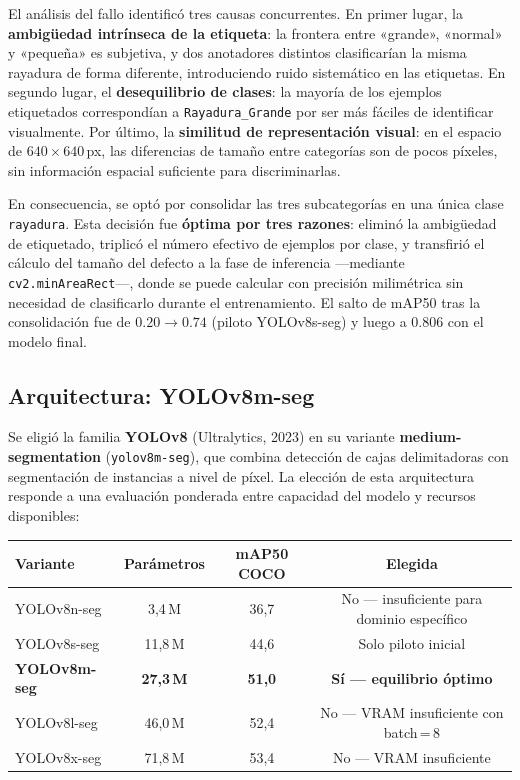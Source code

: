 \documentclass[12pt,a4paper]{article}
\begin{document}
El análisis del fallo identificó tres causas concurrentes. En primer lugar, la
\textbf{ambigüedad intrínseca de la etiqueta}: la frontera entre «grande», «normal»
y «pequeña» es subjetiva, y dos anotadores distintos clasificarían la misma rayadura de
forma diferente, introduciendo ruido sistemático en las etiquetas. En segundo lugar, el
\textbf{desequilibrio de clases}: la mayoría de los ejemplos etiquetados correspondían
a \texttt{Rayadura\_Grande} por ser más fáciles de identificar visualmente. Por último,
la \textbf{similitud de representación visual}: en el espacio de $640\times 640\,$px,
las diferencias de tamaño entre categorías son de pocos píxeles, sin información
espacial suficiente para discriminarlas.

En consecuencia, se optó por consolidar las tres subcategorías en una única clase
\texttt{rayadura}. Esta decisión fue \textbf{óptima por tres razones}: eliminó la
ambigüedad de etiquetado, triplicó el número efectivo de ejemplos por clase, y transfirió
el cálculo del tamaño del defecto a la fase de inferencia —mediante \texttt{cv2.minAreaRect}—,
donde se puede calcular con precisión milimétrica sin necesidad de clasificarlo
durante el entrenamiento. El salto de mAP50 tras la consolidación fue de
$0.20 \to 0.74$ (piloto YOLOv8s-seg) y luego a $\mathbf{0.806}$ con el modelo final.

\subsection{Arquitectura: YOLOv8m-seg}

Se eligió la familia \textbf{YOLOv8} (Ultralytics, 2023) en su variante
\textbf{medium-segmentation} (\texttt{yolov8m-seg}), que combina detección de cajas
delimitadoras con segmentación de instancias a nivel de píxel. La elección de esta
arquitectura responde a una evaluación ponderada entre capacidad del modelo y
recursos disponibles:

\begin{center}
\begin{tabular}{lccc}
  \toprule
  \textbf{Variante} & \textbf{Parámetros} & \textbf{mAP50 COCO} & \textbf{Elegida} \\
  \midrule
  YOLOv8n-seg &  3,4\,M &  36,7 & No — insuficiente para dominio específico \\
  YOLOv8s-seg & 11,8\,M &  44,6 & Solo piloto inicial \\
  \textbf{YOLOv8m-seg} & \textbf{27,3\,M} & \textbf{51,0} & \textbf{Sí — equilibrio óptimo} \\
  YOLOv8l-seg & 46,0\,M &  52,4 & No — VRAM insuficiente con batch\,=\,8 \\
  YOLOv8x-seg & 71,8\,M &  53,4 & No — VRAM insuficiente \\
  \bottomrule
\end{tabular}
\end{center}
\end{document}
